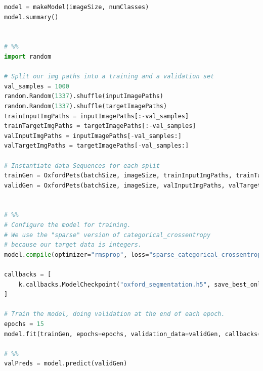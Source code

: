 \begin{lstlisting}[language=python]
model = makeModel(imageSize, numClasses)
model.summary()


# %%
import random

# Split our img paths into a training and a validation set
val_samples = 1000
random.Random(1337).shuffle(inputImagePaths)
random.Random(1337).shuffle(targetImagePaths)
trainInputImgPaths = inputImagePaths[:-val_samples]
trainTargetImgPaths = targetImagePaths[:-val_samples]
valInputImgPaths = inputImagePaths[-val_samples:]
valTargetImgPaths = targetImagePaths[-val_samples:]

# Instantiate data Sequences for each split
trainGen = OxfordPets(batchSize, imageSize, trainInputImgPaths, trainTargetImgPaths)
validGen = OxfordPets(batchSize, imageSize, valInputImgPaths, valTargetImgPaths)


# %%
# Configure the model for training.
# We use the "sparse" version of categorical_crossentropy
# because our target data is integers.
model.compile(optimizer="rmsprop", loss="sparse_categorical_crossentropy")

callbacks = [
    k.callbacks.ModelCheckpoint("oxford_segmentation.h5", save_best_only=True)
]

# Train the model, doing validation at the end of each epoch.
epochs = 15
model.fit(trainGen, epochs=epochs, validation_data=validGen, callbacks=callbacks)

# %%
valPreds = model.predict(validGen)

\end{lstlisting}